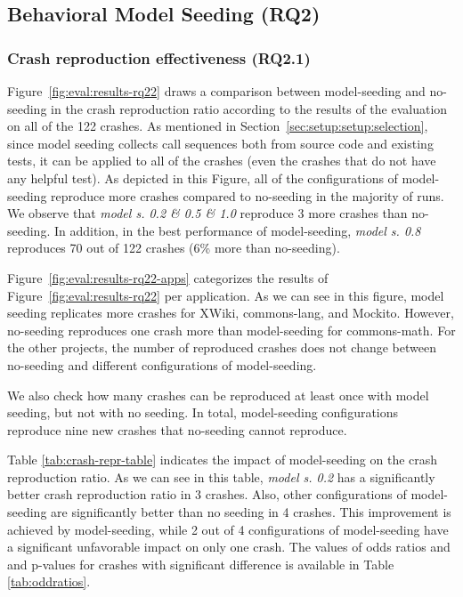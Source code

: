\subsection{Behavioral Model Seeding (\textbf{RQ2})}



\subsubsection{Crash reproduction effectiveness (\textbf{RQ2.1})}

Figure~\ref{fig:eval:results-rq22} draws a comparison between model-seeding and no-seeding in the crash reproduction ratio according to the results of the evaluation on all of the 122 crashes. As mentioned in Section~\ref{sec:setup:setup:selection}, since model seeding collects call sequences both from source code and existing tests, it can be applied to all of the crashes (even the crashes that do not have any helpful test). As depicted in this Figure, all of the configurations of model-seeding reproduce more crashes compared to no-seeding in the majority of runs. We observe that \textit{model s. 0.2 \& 0.5 \& 1.0} reproduce 3 more crashes than no-seeding. In addition, in the best performance of model-seeding, \textit{model s. 0.8} reproduces 70 out of 122 crashes (6\% more than no-seeding).


Figure~\ref{fig:eval:results-rq22-apps} categorizes the results of Figure~\ref{fig:eval:results-rq22} per application. As we can see in this figure, model seeding replicates more crashes for XWiki, commons-lang, and Mockito. However, no-seeding reproduces one crash more than model-seeding for commons-math. For the other projects, the number of reproduced crashes does not change between no-seeding and different configurations of model-seeding. 

We also check how many crashes can be reproduced at least once with model seeding, but not with no seeding. In total, model-seeding configurations reproduce nine new crashes that no-seeding cannot reproduce.

Table \ref{tab:crash-repr-table} indicates the impact of model-seeding on the crash reproduction ratio. As we can see in this table, \textit{model s. 0.2} has a significantly better crash reproduction ratio in 3 crashes. Also, other configurations of model-seeding are significantly better than no seeding in 4 crashes. This improvement is achieved by model-seeding, while 2 out of 4 configurations of model-seeding have a significant unfavorable impact on only one crash. The values of odds ratios and and p-values for crashes with significant difference is available in Table \ref{tab:oddratios}.


